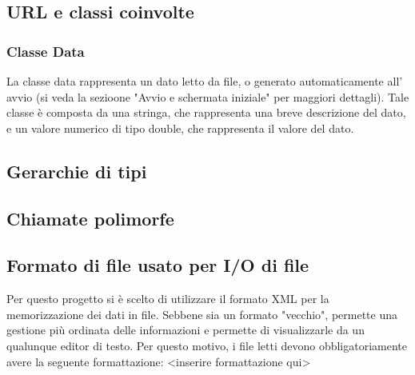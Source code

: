 \documentclass[10pt]{article}
\begin{document}
    \subsection{URL e classi coinvolte}
    \subsubsection{Classe Data}
    La classe data rappresenta un dato letto da file, o generato automaticamente all' avvio (si veda la sezioone "Avvio e schermata iniziale" per maggiori dettagli).
    Tale classe è composta da una stringa, che rappresenta una breve descrizione del dato, e un valore numerico di tipo double, che rappresenta il valore del dato.
    \subsection{Gerarchie di tipi}
    \subsection{Chiamate polimorfe}
    \subsection{Formato di file usato per I/O di file}
    Per questo progetto si è scelto di utilizzare il formato XML per la memorizzazione dei dati in file. Sebbene sia un formato "vecchio", permette una gestione più ordinata delle informazioni e permette di visualizzarle da un qualunque editor di testo.
    Per questo motivo, i file letti devono obbligatoriamente avere la seguente formattazione: <inserire formattazione qui>
	
\end{document}
